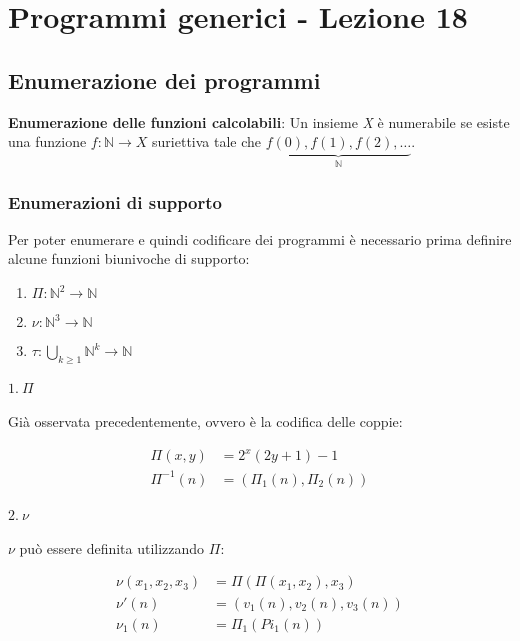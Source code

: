 \chapter{Programmi generici - Lezione 18}

\section{Enumerazione dei programmi}

\textbf{Enumerazione delle funzioni calcolabili}: Un insieme \textit{X} è numerabile se esiste una funzione $ f : \mathbb{N} \rightarrow X $ suriettiva tale che $ \underbrace{f(0), f(1), f(2), \ldots}_{\mathbb{N}} $.


\subsection{Enumerazioni di supporto}
Per poter enumerare e quindi codificare dei programmi è necessario prima definire alcune funzioni biunivoche di supporto:

\begin{enumerate}
	\item $ \Pi : \mathbb{N}^2 \rightarrow \mathbb{N}$
	\item $ \nu : \mathbb{N}^3 \rightarrow \mathbb{N}$
	\item $ \tau : \bigcup\limits_{k \geq 1}\mathbb{N}^k \rightarrow \mathbb{N}$
\end{enumerate}

\subsubsection{$1. \: \Pi $}

Già osservata precedentemente, ovvero è la codifica delle coppie:

\begin{align*}
\Pi(x, y) &= 2^x(2y + 1) - 1\\
\Pi^{-1}(n) &= (\Pi_1(n), \Pi_2(n))
\end{align*}

\subsubsection{$2. \: \nu $}

$\nu $ può essere definita utilizzando $ \Pi $:

\begin{align*}
\nu(x_1, x_2, x_3) &= \Pi(\Pi(x_1,x_2), x_3) \\
\nu'(n) &= (v_1(n), v_2(n), v_3(n)) \\
\nu_1(n) &= \Pi_1(Pi_1(n))
\end{align*}


